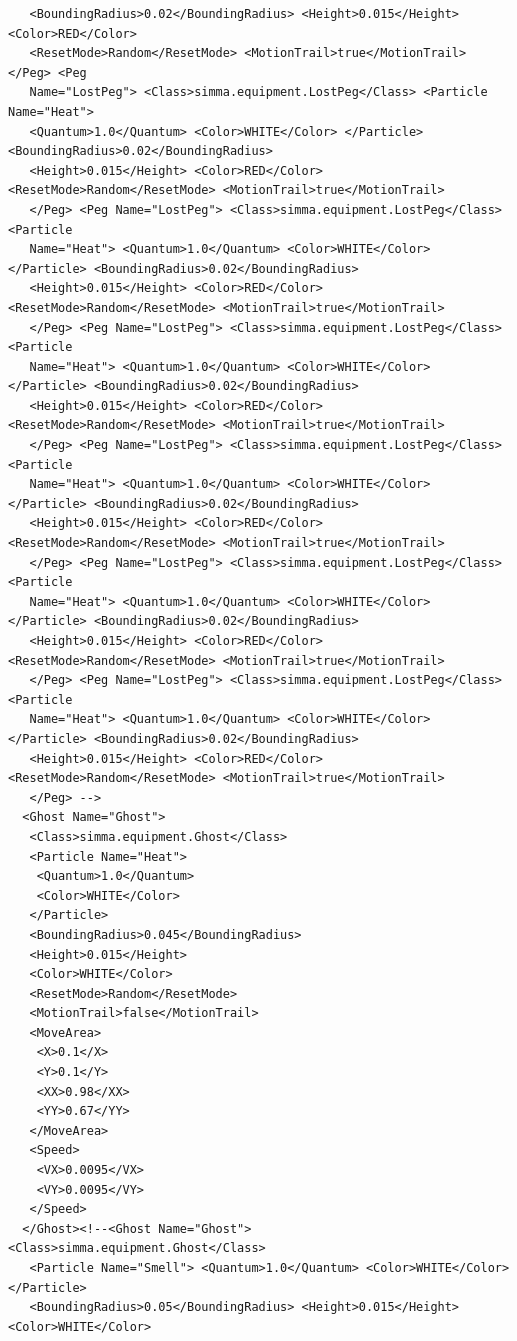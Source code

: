 \documentclass[12pt,fleqn,a4paper]{article}
\begin{document}
\begin{lstlisting}
   <BoundingRadius>0.02</BoundingRadius> <Height>0.015</Height> <Color>RED</Color>
   <ResetMode>Random</ResetMode> <MotionTrail>true</MotionTrail> </Peg> <Peg
   Name="LostPeg"> <Class>simma.equipment.LostPeg</Class> <Particle Name="Heat">
   <Quantum>1.0</Quantum> <Color>WHITE</Color> </Particle> <BoundingRadius>0.02</BoundingRadius>
   <Height>0.015</Height> <Color>RED</Color> <ResetMode>Random</ResetMode> <MotionTrail>true</MotionTrail>
   </Peg> <Peg Name="LostPeg"> <Class>simma.equipment.LostPeg</Class> <Particle
   Name="Heat"> <Quantum>1.0</Quantum> <Color>WHITE</Color> </Particle> <BoundingRadius>0.02</BoundingRadius>
   <Height>0.015</Height> <Color>RED</Color> <ResetMode>Random</ResetMode> <MotionTrail>true</MotionTrail>
   </Peg> <Peg Name="LostPeg"> <Class>simma.equipment.LostPeg</Class> <Particle
   Name="Heat"> <Quantum>1.0</Quantum> <Color>WHITE</Color> </Particle> <BoundingRadius>0.02</BoundingRadius>
   <Height>0.015</Height> <Color>RED</Color> <ResetMode>Random</ResetMode> <MotionTrail>true</MotionTrail>
   </Peg> <Peg Name="LostPeg"> <Class>simma.equipment.LostPeg</Class> <Particle
   Name="Heat"> <Quantum>1.0</Quantum> <Color>WHITE</Color> </Particle> <BoundingRadius>0.02</BoundingRadius>
   <Height>0.015</Height> <Color>RED</Color> <ResetMode>Random</ResetMode> <MotionTrail>true</MotionTrail>
   </Peg> <Peg Name="LostPeg"> <Class>simma.equipment.LostPeg</Class> <Particle
   Name="Heat"> <Quantum>1.0</Quantum> <Color>WHITE</Color> </Particle> <BoundingRadius>0.02</BoundingRadius>
   <Height>0.015</Height> <Color>RED</Color> <ResetMode>Random</ResetMode> <MotionTrail>true</MotionTrail>
   </Peg> <Peg Name="LostPeg"> <Class>simma.equipment.LostPeg</Class> <Particle
   Name="Heat"> <Quantum>1.0</Quantum> <Color>WHITE</Color> </Particle> <BoundingRadius>0.02</BoundingRadius>
   <Height>0.015</Height> <Color>RED</Color> <ResetMode>Random</ResetMode> <MotionTrail>true</MotionTrail>
   </Peg> -->
  <Ghost Name="Ghost">
   <Class>simma.equipment.Ghost</Class>
   <Particle Name="Heat">
    <Quantum>1.0</Quantum>
    <Color>WHITE</Color>
   </Particle>
   <BoundingRadius>0.045</BoundingRadius>
   <Height>0.015</Height>
   <Color>WHITE</Color>
   <ResetMode>Random</ResetMode>
   <MotionTrail>false</MotionTrail>
   <MoveArea>
    <X>0.1</X>
    <Y>0.1</Y>
    <XX>0.98</XX>
    <YY>0.67</YY>
   </MoveArea>
   <Speed>
    <VX>0.0095</VX>
    <VY>0.0095</VY>
   </Speed>
  </Ghost><!--<Ghost Name="Ghost"> <Class>simma.equipment.Ghost</Class>
   <Particle Name="Smell"> <Quantum>1.0</Quantum> <Color>WHITE</Color> </Particle>
   <BoundingRadius>0.05</BoundingRadius> <Height>0.015</Height> <Color>WHITE</Color>

\end{lstlisting}
\end{document}

